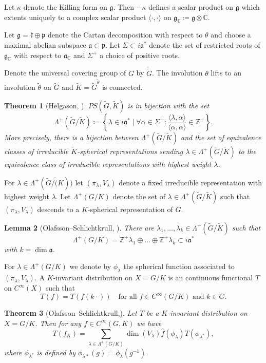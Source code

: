 \documentclass[12pt,reqno,a4paper]{amsart}
\theoremstyle{theorem}
\newtheorem{theorem}{Theorem}[section]
\newtheorem{lemma}[theorem]{Lemma}
\theoremstyle{definition}
\numberwithin{theorem}{section}
\numberwithin{equation}{section}
\newcommand{\Z}{\mathbb{Z}}
\newcommand{\C}{\mathbb{C}}
\begin{document}
Let $\kappa$ denote the Killing form on $\mathfrak{g}$. Then $-\kappa$ defines a scalar product on $\mathfrak{g}$ which extents uniquely to a complex scalar product $\langle \cdot,\cdot\rangle$ on $\mathfrak{g}_\C\coloneqq \mathfrak{g}\otimes \C$.

Let $\mathfrak{g} = \mathfrak{k}\oplus\mathfrak{p}$ denote the Cartan decomposition with respect to $\theta$ and choose a maximal abelian subspace $\mathfrak{a}\subset \mathfrak{p}$. Let $\Sigma\subset i\mathfrak{a}^*$ denote the set of restricted roots of $\mathfrak{g}_\C$ with respect to $\mathfrak{a}_\C$ and $\Sigma^+$ a choice of positive roots.

Denote the universal covering group of $G$ by $\tilde{G}$. The involution $\theta$ lifts to an involution $\tilde{\theta}$ on $\tilde{G}$ and $\tilde{K} = \tilde{G}^{\tilde{\theta}}$ is connected. 
\begin{theorem}[Helgason, \cite{Helgason2}]
	$PS(\tilde{G}, \tilde{K})$ is in bijection with the set
	\[
	\Lambda^+(\tilde{G}/\tilde{K})\coloneqq \left\{\lambda\in i\mathfrak{a}^*\mid \forall \alpha\in \Sigma^+:\frac{\langle \lambda,\alpha\rangle}{\langle \alpha,\alpha\rangle}\in \Z^+\right\}.
	\]
	More precisely, there is a bijection between $\Lambda^+(\tilde{G}/\tilde{K})$ and the set of equivalence classes of irreducible $\tilde{K}$-spherical representations sending $\lambda\in \Lambda^+(\tilde{G}/\tilde{K})$ to the equivalence class of irreducible representations with highest weight $\lambda$.  
\end{theorem}
For $\lambda\in \Lambda^+(\tilde{G}/\tilde(K))$ let $(\pi_\lambda,V_\lambda)$ denote a fixed irreducible representation with highest weight $\lambda$.
Let $\Lambda^+(G/K)$ denote the set of $\lambda\in \Lambda^+(\tilde{G}/\tilde{K})$ such that $(\pi_{\lambda}, V_\lambda)$ descends to a $K$-spherical representation of $G$. 
\begin{lemma}[Olafsson--Schlichtkrull, \cite{OlafssonSchlichtkrull}]
	There are $\lambda_1,\dots,\lambda_k\in \Lambda^+(\tilde{G}/\tilde{K})$ such that
	 \[\Lambda^+(G/K) = \Z^+\lambda_1\oplus \dots\oplus \Z^+\lambda_k\subset i\mathfrak{a}^*\] with $k=\dim\mathfrak{a}$.
\end{lemma}
For $\lambda\in \Lambda^+(G/K)$ we denote by $\phi_\lambda$ the spherical function associated to $(\pi_\lambda, V_\lambda)$.
A $K$-invariant distribution on $X=G/K$ is an continuous functional $T$ on $C^\infty(X)$ such that
\[T(f) = T(f(k\cdot))\quad\text{for all }f\in C^\infty(G/K) \text{ and } k\in G.\] 
\begin{theorem}[Olafsson--Schlichtkrull,\cite{OlafssonSchlichtkrull}]
	Let $T$ be a $K$-invariant distribution on $X=G/K$. Then for any $f\in C^\infty(G, K)$ we have
	\[T(f_K) = \sum_{\lambda\in \Lambda^+(G/K)}\dim(V_\lambda)\widehat{f}(\phi_\lambda)T(\phi_{\lambda^*}),\]
	where $\phi_{\lambda^*}$ is defined by $\phi_{\lambda*}(g) = \phi_\lambda(g^{-1})$.
\end{theorem}
\end{document}
